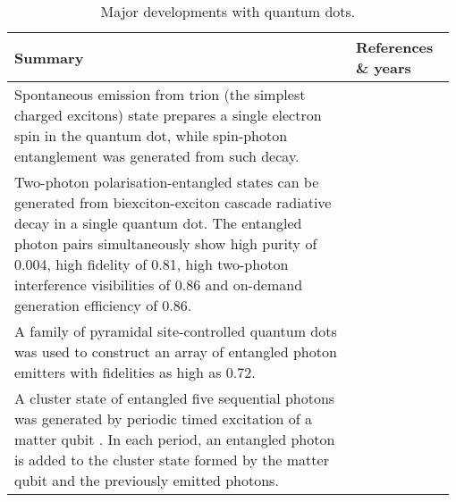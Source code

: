 \begin{table*}[!htbp]
	\begin{tabular}{|p{0.755\linewidth}|p{0.22\linewidth}|}
		\hline
		Summary & References \& years \\
		\hline \hline
		Spontaneous emission from trion (the simplest charged excitons) state prepares a single electron spin in the quantum dot, while spin-photon entanglement was generated from such decay. &  \cite{bib:de2012quantum, bib:gao2012observation} \\
		\hline
	    Two-photon polarisation-entangled states can be generated from biexciton-exciton cascade radiative decay in a single quantum dot. The entangled photon pairs simultaneously show high purity of 0.004, high fidelity of 0.81, high two-photon interference visibilities of 0.86 and on-demand generation efficiency of 0.86. & \cite{bib:muller2014demand} \\
		\hline
		A family of pyramidal site-controlled quantum dots was used to construct an array of entangled photon emitters with fidelities as high as 0.72. & \cite{bib:juska2013towards, bib:mohan2010polarization} \\
		\hline
		A cluster state of entangled five sequential photons was generated by periodic timed excitation of a matter qubit . In each period, an entangled photon is added to the cluster state formed by the matter qubit and the previously emitted photons. & \cite{bib:schwartz2016deterministic} \\
		\hline
	\end{tabular}
	\captionspacetab \caption{Major developments with quantum dots.} \label{tab:quantum_dots}
\end{table*}

